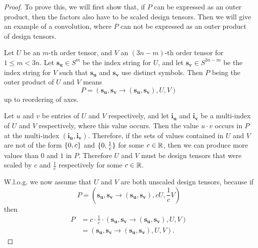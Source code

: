 \bigskip
\begin{proof}
    \small
    To prove this, we will first show that, if $P$ can be expressed as an outer product, then the factors also have to be scaled design tensors.
    Then we will give an example of a convolution, where $P$ can not be expressed as an outer product of design tensors.

    Let $U$ be an $m$-th order tensor, and $V$ an $(3n-m)$-th order tensor for $1 \leq m < 3n$.
    Let $\bm{s_u} \in S^{m}$ be the index string for $U$,
    and let $\bm{s_v} \in S^{3n - m}$ be the index string for $V$ such that $\bm{s_u}$ and $\bm{s_v}$ use distinct symbols.
    Then $P$ being the outer product of $U$ and $V$ means
    $$P = (\bm{s_u}, \bm{s_v} \rightarrow (\bm{s_u}, \bm{s_v}), U, V)$$
    up to reordering of axes.

    Let $u$ and $v$ be entries of $U$ and $V$ respectively, and let $\bm{i_u}$ and $\bm{i_v}$ be a multi-index of $U$ and $V$ respectively, where this value occurs.
    Then the value $u \cdot v$ occurs in $P$ at the multi-index $(\bm{i_u}, \bm{i_v})$.
    Therefore, if the sets of values contained in $U$ and $V$ are not of the form $\lbrace 0, c \rbrace$ and $\lbrace 0, \frac{1}{c} \rbrace$ for some $c \in \mathbb{R}$, then we can produce more values than $0$ and $1$ in $P$.
    Therefore $U$ and $V$ must be design tensors that were scaled by $c$ and $\frac{1}{c}$ respectively for some $c \in \mathbb{R}$.

    W.l.o.g. we now assume that $U$ and $V$ are both unscaled design tensors, because if
    $$P = (\bm{s_u}, \bm{s_v} \rightarrow (\bm{s_u}, \bm{s_v}), c U, \frac{1}{c} V)$$
    then
    \begin{align*}
        P & = c\cdot \frac{1}{c} \cdot (\bm{s_u}, \bm{s_v} \rightarrow (\bm{s_u}, \bm{s_v}), U, V) \\
          & = (\bm{s_u}, \bm{s_v} \rightarrow (\bm{s_u}, \bm{s_v}), U, V).
    \end{align*}


\end{proof}
